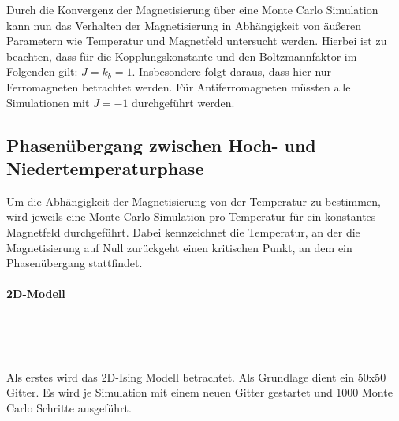 
Durch die Konvergenz der Magnetisierung über eine Monte Carlo Simulation kann nun das Verhalten der Magnetisierung in Abhängigkeit von äußeren Parametern wie Temperatur und Magnetfeld untersucht werden. Hierbei ist zu beachten, dass für die Kopplungskonstante und den Boltzmannfaktor im Folgenden gilt: $J=k_{b}=1$. Insbesondere folgt daraus, dass hier nur Ferromagneten betrachtet werden. Für Antiferromagneten müssten alle Simulationen mit $J=-1$ durchgeführt werden.


\subsection{Phasenübergang zwischen Hoch- und Niedertemperaturphase}
\label{auswT}

Um die Abhängigkeit der Magnetisierung von der Temperatur zu bestimmen, wird jeweils eine Monte Carlo Simulation pro Temperatur für ein konstantes Magnetfeld durchgeführt. Dabei kennzeichnet die Temperatur, an der die Magnetisierung auf Null zurückgeht einen kritischen Punkt, an dem ein Phasenübergang stattfindet.


\paragraph*{2D-Modell}

\

\

Als erstes wird das 2D-Ising Modell betrachtet. Als Grundlage dient ein 50x50 Gitter. Es wird je Simulation mit einem neuen Gitter gestartet und 1000 Monte Carlo Schritte ausgeführt. 


